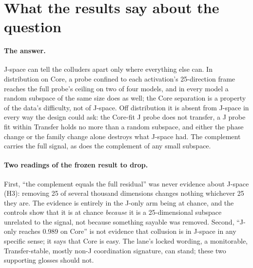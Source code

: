 \documentclass[11pt,a4paper]{article}
\begin{document}
\section{What the results say about the question}
\label{sec:discussion}

\paragraph{The answer.} J-space can tell the colluders apart only where everything else can. In distribution on Core, a probe confined to each activation's 25-direction frame reaches the full probe's ceiling on two of four models, and in every model a random subspace of the same size does as well; the Core separation is a property of the data's difficulty, not of J-space. Off distribution it is absent from J-space in every way the design could ask: the Core-fit J probe does not transfer, a J probe fit within Transfer holds no more than a random subspace, and either the phase change or the family change alone destroys what J-space had. The complement carries the full signal, as does the complement of any small subspace.

\paragraph{Two readings of the frozen result to drop.} First, ``the complement equals the full residual'' was never evidence about J-space (H3): removing 25 of several thousand dimensions changes nothing whichever 25 they are. The evidence is entirely in the J-only arm being at chance, and the controls show that it is at chance \emph{because} it is a 25-dimensional subspace unrelated to the signal, not because something sayable was removed. Second, ``J-only reaches 0.989 on Core'' is not evidence that collusion is in J-space in any specific sense; it says that Core is easy. The lane's locked wording, a monitorable, Transfer-stable, mostly non-J coordination signature, can stand; these two supporting glosses should not.
\end{document}
